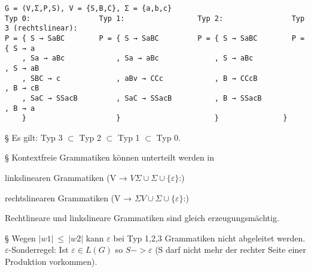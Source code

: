 \documentclass[11pt,
			a4paper,
			parskip=full,
			toc=bib,
			toc=idx,
			toc=listof,
			ngerman
			listof=totoc,]{scrartcl}
\newenvironment{cmt}%
{\color{mygray} § }
{\color{black}}
\newenvironment{expl}%
{\color{red}}
{\color{black}}
\newcommand{\compress}{\vspace{-1em}}
\begin{document}
\compress
\compress
\begin{expl}
\begin{verbatim}
G = (V,Σ,P,S), V = {S,B,C}, Σ = {a,b,c}
Typ 0:                Typ 1:                 Typ 2:                Typ 3 (rechtslinear):
P = { S → SaBC        P = { S → SaBC         P = { S → SaBC        P = { S → a
    , Sa → aBc            , Sa → aBc             , S → aBc             , S → aB
    , SBC → c             , aBv → CCc            , B → CCcB            , B → cB
    , SaC → SSacB         , SaC → SSacB          , B → SSacB           , B → a
    }                     }                      }				 }
\end{verbatim}
\end{expl}

\compress
\compress
\begin{cmt}
Es gilt: Typ 3 $⊂$ Typ 2 $⊂$ Typ 1 $⊂$ Typ 0.
\end{cmt}


\compress
\begin{cmt}
Kontextfreie Grammatiken können unterteilt werden in 

\compress
\begin{compactitem}
  \item linkslinearen Grammatiken (V → $VΣ ∪ Σ ∪ \{ε\}$:)
  \item rechtslinearen Grammatiken (V → $ΣV ∪ Σ ∪ \{ε\}$:)
\end{compactitem}
\compress
Rechtlineare und linkslineare Grammatiken sind gleich erzeugungsmächtig.
\end{cmt}

\compress
\begin{cmt}
Wegen $|w1| ~ ≤ ~ |w2|$ kann $ε$ bei Typ 1,2,3 Grammatiken nicht abgeleitet werden.\\
$ε$-Sonderregel: Ist $ε ∈ L(G)$ so $S -> ε$ (S darf nicht mehr der rechter Seite einer Produktion vorkommen).
\end{cmt}
\end{document}
